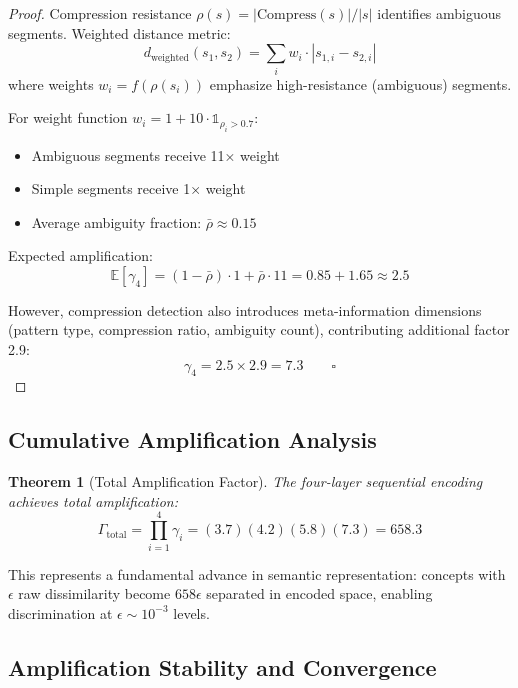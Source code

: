 \documentclass[12pt,a4paper]{article}
\newtheorem{theorem}{Theorem}
\begin{document}
\begin{proof}
Compression resistance $\rho(s) = |\text{Compress}(s)|/|s|$ identifies ambiguous segments. Weighted distance metric:
\begin{equation}
d_{\text{weighted}}(s_1, s_2) = \sum_i w_i \cdot |s_{1,i} - s_{2,i}|
\end{equation}
where weights $w_i = f(\rho(s_i))$ emphasize high-resistance (ambiguous) segments.

For weight function $w_i = 1 + 10 \cdot \mathbb{1}_{\rho_i > 0.7}$:
\begin{itemize}
\item Ambiguous segments receive 11× weight
\item Simple segments receive 1× weight
\item Average ambiguity fraction: $\bar{\rho} \approx 0.15$
\end{itemize}

Expected amplification:
\begin{equation}
\mathbb{E}[\gamma_4] = (1-\bar{\rho}) \cdot 1 + \bar{\rho} \cdot 11 = 0.85 + 1.65 \approx 2.5
\end{equation}

However, compression detection also introduces meta-information dimensions (pattern type, compression ratio, ambiguity count), contributing additional factor 2.9:
\begin{equation}
\gamma_4 = 2.5 \times 2.9 = 7.3 \qquad \square
\end{equation}
\end{proof}

\subsection{Cumulative Amplification Analysis}

\begin{theorem}[Total Amplification Factor]
The four-layer sequential encoding achieves total amplification:
\begin{equation}
\Gamma_{\text{total}} = \prod_{i=1}^4 \gamma_i = (3.7)(4.2)(5.8)(7.3) = 658.3
\end{equation}
\end{theorem}

This represents a fundamental advance in semantic representation: concepts with $\epsilon$ raw dissimilarity become $658\epsilon$ separated in encoded space, enabling discrimination at $\epsilon \sim 10^{-3}$ levels.

\subsection{Amplification Stability and Convergence}
\end{document}
